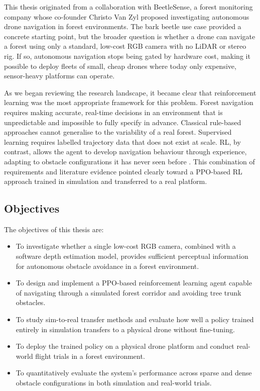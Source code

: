 \documentclass[../main.tex]{subfiles}
\begin{document}
This thesis originated from a collaboration with BeetleSense, a forest monitoring company whose co-founder Christo Van Zyl proposed investigating autonomous drone navigation in forest environments. The bark beetle use case provided a concrete starting point, but the broader question is whether a drone can navigate a forest using only a standard, low-cost RGB camera with no LiDAR or stereo rig. If so, autonomous navigation stops being gated by hardware cost, making it possible to deploy fleets of small, cheap drones where today only expensive, sensor-heavy platforms can operate.

As we began reviewing the research landscape, it became clear that reinforcement learning was the most appropriate framework for this problem. Forest navigation requires making accurate, real-time decisions in an environment that is unpredictable and impossible to fully specify in advance. Classical rule-based approaches cannot generalise to the variability of a real forest. Supervised learning requires labelled trajectory data that does not exist at scale. RL, by contrast, allows the agent to develop navigation behaviour through experience, adapting to obstacle configurations it has never seen before \cite{Fu2024,Schulman2017}. This combination of requirements and literature evidence pointed clearly toward a PPO-based RL approach trained in simulation and transferred to a real platform.

\subsection{Objectives}

The objectives of this thesis are:

\begin{itemize}
    \item To investigate whether a single low-cost RGB camera, combined with a software depth estimation model, provides sufficient perceptual information for autonomous obstacle avoidance in a forest environment.
    \item To design and implement a PPO-based reinforcement learning agent capable of navigating through a simulated forest corridor and avoiding tree trunk obstacles.
    \item To study sim-to-real transfer methods and evaluate how well a policy trained entirely in simulation transfers to a physical drone without fine-tuning.
    \item To deploy the trained policy on a physical drone platform and conduct real-world flight trials in a forest environment.
    \item To quantitatively evaluate the system's performance across sparse and dense obstacle configurations in both simulation and real-world trials.
\end{itemize}
\end{document}
